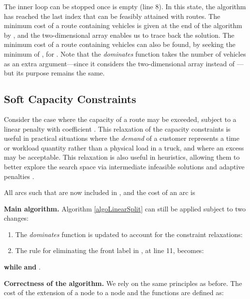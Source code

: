 \documentclass[11pt]{article}
\begin{document}
The inner loop can be stopped once  is empty (line 8). In this state, the algorithm has reached the last index that can be feasibly attained with  routes.
The minimum cost of a route containing  vehicles is given at the end of the algorithm by , and the two-dimensional array  enables us to trace back the solution. 
The minimum cost of a route containing  vehicles can also be found, by seeking the minimum of , for .
Note that the \emph{dominates} function takes the number of vehicles  as an extra argument---since it considers the two-dimensional array  instead of ---but its purpose remains the same.

\subsection{Soft Capacity Constraints}
\label{sectionLinearSoft}

Consider the case where the capacity of a route may be exceeded, subject to a linear penalty with coefficient . This relaxation of the capacity constraints is useful in practical situations where the \emph{demand} of a customer represents a time or workload quantity rather than a physical load in a truck, and where an excess may be acceptable. This relaxation is also useful in heuristics, allowing them to better explore the search space via intermediate infeasible solutions and adaptive penalties \citep{Gendreau1994,Cordeau1997,Vidal2013a}.

All arcs  such that  are now included in , and the cost of an arc  is


\noindent
\textbf{Main algorithm.}
Algorithm \ref{algoLinearSplit} can still be applied subject to two changes:
\begin{enumerate}
\item The \emph{dominates} function is updated to account for the constraint relaxations:

\item The rule for eliminating the front label in , at line 11, becomes:
\end{enumerate}

\begin{center}
\textbf{while}   \textbf{and} . \\ \vspace*{0.3cm}
\end{center}

\noindent
\textbf{Correctness of the algorithm.}
We rely on the same principles as before.
The cost  of the extension of a node  to a node  and the functions  are  defined as:
\end{document}
